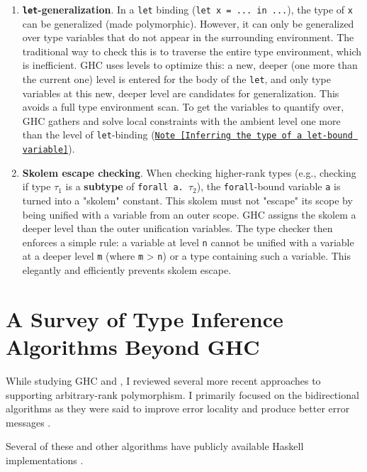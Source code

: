 \begin{enumerate}
    \item \textbf{\texttt{let}-generalization}. In a \texttt{let} binding (\texttt{let x = ... in ...}), the type of \texttt{x} can be generalized (made polymorphic). However, it can only be generalized over type variables that do not appear in the surrounding environment. The traditional way to check this is to traverse the entire type environment, which is inefficient. GHC uses levels to optimize this: a new, deeper (one more than the current one) level is entered for the body of the \texttt{let}, and only type variables at this new, deeper level are candidates for generalization. This avoids a full type environment scan. To get the variables to quantify over, GHC gathers and solve local constraints with the ambient level one more than the level of \texttt{let}-binding (\href{https://github.com/ghc/ghc/blob/ed38c09bd89307a7d3f219e1965a0d9743d0ca73/compiler/GHC/Tc/Solver.hs#L790}{\texttt{Note [Inferring the type of a let-bound variable]}}).

    \item \textbf{Skolem escape checking}. When checking higher-rank types (e.g., checking if type ${\tau_1}$ is a \textbf{subtype} of \texttt{forall a. $\tau_2$}), the \texttt{forall}-bound variable \texttt{a} is turned into a "skolem" constant. This skolem must not "escape" its scope by being unified with a variable from an outer scope. GHC assigns the skolem a deeper level than the outer unification variables. The type checker then enforces a simple rule: a variable at level \texttt{n} cannot be unified with a variable at a deeper level \texttt{m} (where \texttt{m} > \texttt{n}) or a type containing such a variable. This elegantly and efficiently prevents skolem escape.
\end{enumerate}

\section{A Survey of Type Inference Algorithms Beyond GHC}
\label{chap:LiteratureReview:sec:TypeInferenceAlgorithm}

While studying GHC and \cite{jones-practical-2007}, I reviewed several more recent approaches to supporting arbitrary-rank polymorphism. I primarily focused on the bidirectional algorithms as they were said to improve error locality and produce better error messages \cite{dunfield-bidirectional-2020}.

Several of these and other algorithms have publicly available Haskell implementations \cite{github-goldenberg-artem-goldenbergbidirectionalsystem-2025, github-choi-kwanghoonbidi-2025, github-chen-cu1ch3ntype-inference-zoo-2025}.

